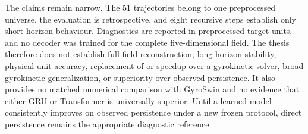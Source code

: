 The claims remain narrow. The 51 trajectories belong to one preprocessed universe, the evaluation
is retrospective, and eight recursive steps establish only short-horizon behaviour. Diagnostics are
reported in preprocessed target units, and no decoder was trained for the complete five-dimensional
field. The thesis therefore does not establish full-field reconstruction, long-horizon stability,
physical-unit accuracy, replacement of or speedup over a gyrokinetic solver, broad gyrokinetic
generalization, or superiority over observed persistence. It also provides no matched numerical
comparison with GyroSwin and no evidence that either GRU or Transformer is universally superior.
Until a learned model consistently improves on observed persistence under a new frozen protocol,
direct persistence remains the appropriate diagnostic reference.
